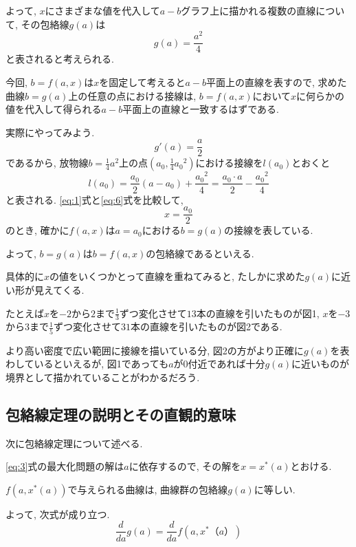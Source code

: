 \documentclass[11pt,a4j,fleqn]{jarticle}
\begin{document}
よって, $x$にさまざまな値を代入して$a-b$グラフ上に描かれる複数の直線について, その包絡線$g(a)$は
\begin{equation} 
g(a) = \frac{a^2}{4} \label{eq:4}
\end{equation}
と表されると考えられる.

今回, $b=f(a, x)$は$x$を固定して考えると$a-b$平面上の直線を表すので, 求めた曲線$b=g(a)$上の任意の点における接線は, $b=f(a, x)$において$x$に何らかの値を代入して得られる$a-b$平面上の直線と一致するはずである.

実際にやってみよう.
\begin{equation} 
g'(a) = \frac{a}{2} \label{eq:5}
\end{equation}
であるから, 放物線$b=\frac{1}{4}a^2$上の点$(a_0,\frac{1}{4}{a_0}^2 )$における接線を$l(a_0)$とおくと\\
\begin{equation} 
l(a_0)=\frac{a_0}{2}(a-a_0)+\frac{{a_0}^2}{4}=\frac{a_0 \cdot a}{2} - \frac{{a_0}^2}{4} \label{eq:6}
\end{equation}
と表される. \eqref{eq:1}式と\eqref{eq:6}式を比較して, 
\begin{equation*} 
x = \frac{a_0}{2}
\end{equation*}
のとき, 確かに$f(a,  x)$は$a=a_0$における$b=g(a)$の接線を表している.

よって, $b=g(a)$は$b=f(a,x)$の包絡線であるといえる.

具体的に$x$の値をいくつかとって直線を重ねてみると, たしかに求めた$g(a)$に近い形が見えてくる.

たとえば$x$を$-2$から$2$まで$\frac{1}{3}$ずつ変化させて$13$本の直線を引いたものが図1, 
$x$を$-3$から$3$まで$\frac{1}{5}$ずつ変化させて$31$本の直線を引いたものが図2である.

より高い密度で広い範囲に接線を描いている分, 図2の方がより正確に$g(a)$を表わしているといえるが, 図1であっても$a$が0付近であれば十分$g(a)$に近いものが境界として描かれていることがわかるだろう.\\


\subsection{包絡線定理の説明とその直観的意味}
次に包絡線定理について述べる.

\eqref{eq:3}式の最大化問題の解は$a$に依存するので, その解を$x=x^* (a)$とおける.


$f(a,x^* (a))$で与えられる曲線は, 曲線群の包絡線$g(a)$に等しい.

よって, 次式が成り立つ.
\begin{equation}
\frac{d}{da}g(a)=\frac{d}{da}f(a,x^*（a）)\label{eq:7}
\end{equation}
\end{document}
